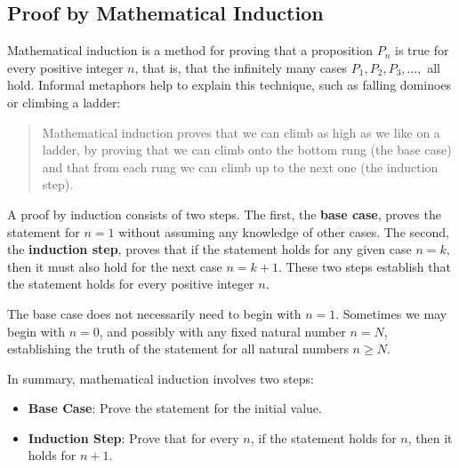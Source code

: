 \subsection{Proof by Mathematical Induction}
Mathematical induction is a method for proving that a proposition $P_n$ is true for every positive integer $n$, that is, that the infinitely many cases $P_1, P_2, P_3, \dots,$ all hold. Informal metaphors help to explain this technique, such as falling dominoes or climbing a ladder:
\begin{quote}
    Mathematical induction proves that we can climb as high as we like on a ladder, by proving that we can climb onto the bottom rung (the base case) and that from each rung we can climb up to the next one (the induction step).
\end{quote}

A proof by induction consists of two steps. The first, the \textbf{base case}, proves the statement for $n = 1$ without assuming any knowledge of other cases. The second, the \textbf{induction step}, proves that if the statement holds for any given case $n = k$, then it must also hold for the next case $n = k + 1$. These two steps establish that the statement holds for every positive integer $n$.

The base case does not necessarily need to begin with $n = 1$. Sometimes we may begin with $n = 0$, and possibly with any fixed natural number $n = N$, establishing the truth of the statement for all natural numbers $n \geq N$.

In summary, mathematical induction involves two steps:
\begin{itemize}
    \item \textbf{Base Case}: Prove the statement for the initial value.
    \item \textbf{Induction Step}: Prove that for every $n$, if the statement holds for $n$, then it holds for $n + 1$.
\end{itemize}


